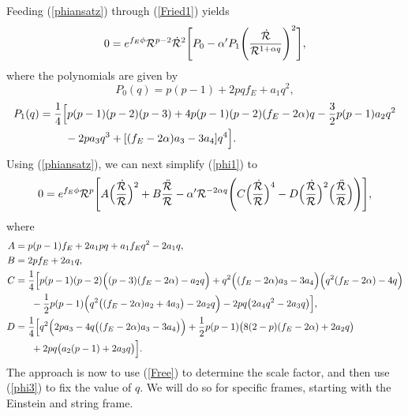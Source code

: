 \documentclass[amsmath,amssymb,11pt]{article}
\begin{document}
 Feeding (\ref{phiansatz}) through (\ref{Fried1}) yields
\begin{equation}\label{Free}
0=e^{f_E\phi}\mathcal{R}^{p-2}\dot{\mathcal{R}}^2\Bigg[P_0 - \alpha' P_1\Bigg(\frac{\dot{\mathcal{R}}}{\mathcal{R}^{1+\alpha q}}\Bigg)^2\Bigg],
\end{equation}
where the polynomials are given by
\begin{equation}\label{newP0}
P_0(q) = p(p-1)+2pqf_E+a_1 q^2,
\end{equation}
\begin{equation}\label{newP1}
\begin{split}
P_1(q) &= \frac{1}{4}\Big[p(p-1)(p-2)(p-3)+4p(p-1)(p-2)(f_E-2\alpha)q-\frac{3}{2}p(p-1)a_2 q^2 \\
& \ \ \ \ \ \ \ -2pa_3 q^3+[(f_E-2\alpha)a_3-3a_4]q^4\Big].
\end{split}
\end{equation}
Using (\ref{phiansatz}), we can next simplify (\ref{phi1}) to
\begin{equation}\label{phi3}
\begin{split}
0=e^{f_E\phi}\mathcal{R}^p\Bigg[A\Big(\frac{\dot{\mathcal{R}}}{\mathcal{R}}\Big)^2+B\frac{\ddot{\mathcal{R}}}{\mathcal{R}}-\alpha'\mathcal{R}^{-2\alpha q}\Bigg(C\Big(\frac{\dot{\mathcal{R}}}{\mathcal{R}}\Big)^4-D\Big(\frac{\dot{\mathcal{R}}}{\mathcal{R}}\Big)^2\Big(\frac{\ddot{\mathcal{R}}}{\mathcal{R}}\Big)\Bigg)\Bigg],
\end{split}
\end{equation}
where 
\begin{equation}
\begin{split}
A &= p(p-1)f_E+2a_1pq+a_1f_Eq^2-2a_1 q, \\
B &= 2pf_E+2a_1q, \\
C&= \frac{1}{4}\Big[p(p-1)(p-2)\Big((p-3)(f_E-2\a)-a_2 q\Big)+q^2\Big((f_E-2\a)a_3-3a_4\Big)\Big(q^2(f_E-2\a)-4q\Big) \\
& \ \ \ \ \ -\frac{1}{2}p(p-1)\Big(q^2\big((f_E-2\a)a_2+4a_3\big)-2a_2 q\Big) -2pq\big(2a_4 q^2-2a_3 q\big)\Big], \\
D &=\frac{1}{4}\Big[ q^2\Big(2pa_3-4q\big((f_E-2\a)a_3-3a_4\big)\Big)+\frac{1}{2}p(p-1)\big(8(2-p)(f_E-2\a)+2a_2 q\big) \\
& \ \ \ \ \ +2pq\big(a_2(p-1)+2a_3 q\big)\Big].
\end{split}
\end{equation}
The approach is now to use (\ref{Free}) to determine the scale factor, and then use (\ref{phi3}) to fix the value of $q$. We will do so for specific frames, starting with the Einstein and string frame.




\end{document}
